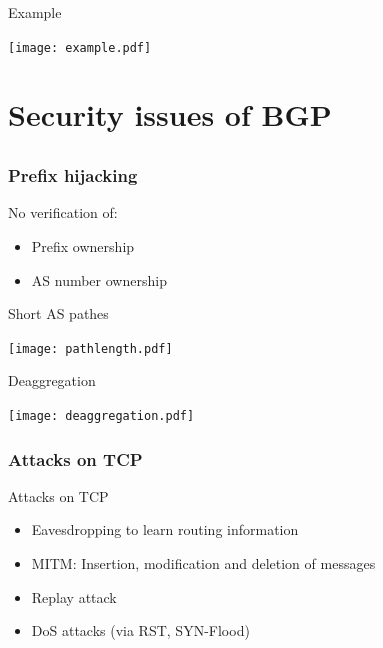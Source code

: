 \documentclass[notes=hide,yellow]{beamer}
\begin{document}
\begin{frame}{Example}
	\begin{center}
		\texttt{[image: example.pdf]}
	\end{center}	
\end{frame}


\section{Security issues of BGP}
\subsection*{}
\begin{frame}
	\frametitle{Prefix hijacking}
		
	\begin{block}{No verification of:}
		\begin{itemize}
			\item Prefix ownership
			\item AS number ownership
		\end{itemize}
	\end{block}
\end{frame}

\begin{frame}{Short AS pathes}
	\begin{center}
		\texttt{[image: pathlength.pdf]}
	\end{center}
\end{frame}

\begin{frame}{Deaggregation}
	\begin{center}
		\texttt{[image: deaggregation.pdf]}
	\end{center}
\end{frame}

\begin{frame}
	\frametitle{Attacks on TCP}
	
	\begin{block}{Attacks on TCP}
	\begin{itemize}
		\item Eavesdropping to learn routing information
		\item MITM: Insertion, modification and deletion of messages
		\item Replay attack
		\item DoS attacks (via RST, SYN-Flood)
	\end{itemize}
	\end{block}
\end{frame}
\end{document}
